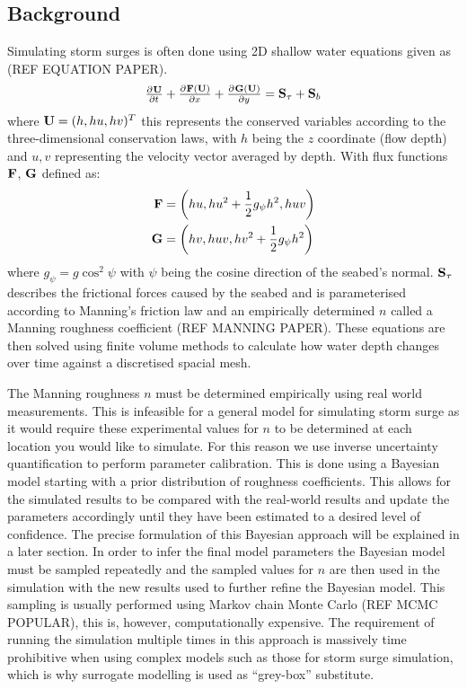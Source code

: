 \documentclass[12pt,a4paper]{article}
\begin{document}
\subsection{Background}
\noindent
Simulating storm surges is often done using 2D shallow water equations given as (REF EQUATION PAPER).
\begin{equation}
	\pd{{\bf U}}{t}+\pd{{\bf F(U)}}{x}+\pd{{\bf G(U)}}{y}={\bf S}_\tau+{\bf S}_b
\end{equation}
where ${\bf U}=(h,hu,hv)^T$ this represents the conserved variables according to the three-dimensional conservation laws, with $h$ being the $z$ coordinate (flow depth) and $u, v$ representing the velocity vector averaged by depth. With flux functions ${\bf F}$, ${\bf G}$ defined as:
\begin{align}
	{\bf F} &= \left( hu,hu^2+\frac{1}{2}g_\psi h^2,huv \right) \\
	{\bf G} &= \left( hv,huv,hv^2+\frac{1}{2}g_\psi h^2 \right)
\end{align}
where $g_\psi=g\cos^2\psi$ with $\psi$ being the cosine direction of the seabed's normal. ${\bf S}_\tau$ describes the frictional forces caused by the seabed and is parameterised according to Manning's friction law and an empirically determined $n$ called a Manning roughness coefficient (REF MANNING PAPER). These equations are then solved using finite volume methods to calculate how water depth changes over time against a discretised spacial mesh.

The Manning roughness $n$ must be determined empirically using real world measurements. This is infeasible for a general model for simulating storm surge as it would require these experimental values for $n$ to be determined at each location you would like to simulate. For this reason we use inverse uncertainty quantification to perform parameter calibration. This is done using a Bayesian model starting with a prior distribution of roughness coefficients. This allows for the simulated results to be compared with the real-world results and update the parameters accordingly until they have been estimated to a desired level of confidence. The precise formulation of this Bayesian approach will be explained in a later section. In order to infer the final model parameters the Bayesian model must be sampled repeatedly and the sampled values for $n$ are then used in the simulation with the new results used to further refine the Bayesian model. This sampling is usually performed using Markov chain Monte Carlo (REF MCMC POPULAR), this is, however, computationally expensive. The requirement of running the simulation multiple times in this approach is massively time prohibitive when using complex models such as those for storm surge simulation, which is why surrogate modelling is used as ``grey-box'' substitute.
\end{document}
